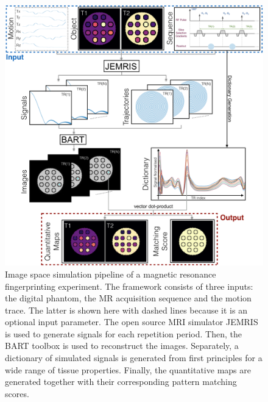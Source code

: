 \begin{figure}[ht]
    \centering
    \includegraphics[angle=0,width=1\textwidth, keepaspectratio]{images/mrf/methodFramework}
    \caption{Image space simulation pipeline of a magnetic resonance fingerprinting experiment.
    The framework consists of three inputs: the digital phantom, the MR acquisition sequence and the motion trace. 
    The latter is shown here with dashed lines because it is an optional input parameter. 
    The open source MRI simulator JEMRIS is used to generate signals for each repetition period.
    Then, the BART toolbox is used to reconstruct the images.
    Separately, a dictionary of simulated signals is generated from first principles for a wide range of tissue properties.
    Finally, the quantitative maps are generated together with their corresponding pattern matching scores.}
    \label{fig:methodFramework}
\end{figure}

\hfill

